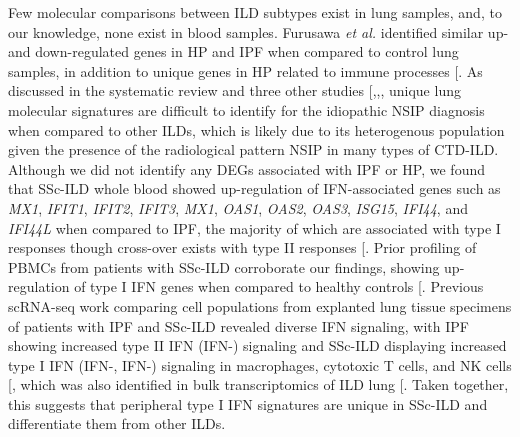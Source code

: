 \documentclass[
]{article}
\begin{document}
Few molecular comparisons between ILD subtypes exist in lung samples, and, to our knowledge, none exist in blood samples. Furusawa \textit{et al.} identified similar up- and down-regulated genes in HP and IPF when compared to control lung samples, in addition to unique genes in HP related to immune processes {[}\citeproc{ref-furusawa_chronic_2020}{67}{]}. As discussed in the systematic review and three other studies {[},,\citeproc{ref-horimasu_gene_2017}{83}{]}, unique lung molecular signatures are difficult to identify for the idiopathic NSIP diagnosis when compared to other ILDs, which is likely due to its heterogenous population given the presence of the radiological pattern NSIP in many types of CTD-ILD. Although we did not identify any DEGs associated with IPF or HP, we found that SSc-ILD whole blood showed up-regulation of IFN-associated genes such as \textit{MX1}, \textit{IFIT1}, \textit{IFIT2}, \textit{IFIT3}, \textit{MX1}, \textit{OAS1}, \textit{OAS2}, \textit{OAS3}, \textit{ISG15}, \textit{IFI44}, and \textit{IFI44L} when compared to IPF, the majority of which are associated with type I responses though cross-over exists with type II responses {[}\citeproc{ref-singhania_transcriptional_2019}{123}{]}. Prior profiling of PBMCs from patients with SSc-ILD corroborate our findings, showing up-regulation of type I IFN genes when compared to healthy controls {[}\citeproc{ref-tan_signatures_2006}{124}{]}. Previous scRNA-seq work comparing cell populations from explanted lung tissue specimens of patients with IPF and SSc-ILD revealed diverse IFN signaling, with IPF showing increased type II IFN (IFN-\gamma) signaling and SSc-ILD displaying increased type I IFN (IFN-\alpha, IFN-\beta) signaling in macrophages, cytotoxic T cells, and NK cells {[}\citeproc{ref-valenzi_disparate_2021}{125}{]}, which was also identified in bulk transcriptomics of ILD lung {[}\citeproc{ref-christmann_association_2014}{126}{]}. Taken together, this suggests that peripheral type I IFN signatures are unique in SSc-ILD and differentiate them from other ILDs.
\end{document}
